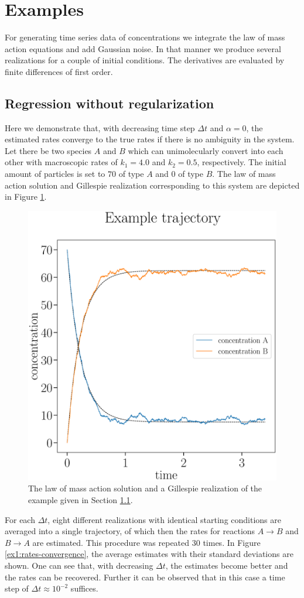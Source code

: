 \documentclass[oneside, abstracton, titlepage]{scrartcl}
\begin{document}
	\section{Examples}

	For generating time series data of concentrations we integrate the law of mass action equations and add Gaussian noise. In that manner we produce several realizations for a couple of initial conditions. The derivatives are evaluated by finite differences of first order.

	\subsection{Regression without regularization}
	\label{sec:ex1}

	Here we demonstrate that, with decreasing time step $\Delta t$ and $\alpha=0$, the estimated rates converge to the true rates if there is no ambiguity in the system. Let there be two species $A$ and $B$ which can unimolecularly convert into each other with macroscopic rates of $k_1=4.0$ and $k_2=0.5$, respectively. The initial amount of particles is set to $70$ of type $A$ and $0$ of type $B$. The law of mass action solution and Gillespie realization corresponding to this system are depicted in Figure \ref{ex1:concentration-curves}.

	\begin{figure}
		\begin{center}
			\includegraphics[width=.5\textwidth]{./figures_tex/aux_ex1_concentration_curves}
		\end{center}
		\caption{The law of mass action solution and a Gillespie realization of the example given in Section \ref{sec:ex1}.}
		\label{ex1:concentration-curves}
	\end{figure}

	For each $\Delta t$, eight different realizations with identical starting conditions are averaged into a single trajectory, of which then the rates for reactions $A\to B$ and $B\to A$ are estimated. This procedure was repeated $30$ times. In Figure \ref{ex1:rates-convergence}, the average estimates with their standard deviations are shown. One can see that, with decreasing $\Delta t$, the estimates become better and the rates can be recovered. Further it can be observed that in this case a time step of $\Delta t\approx 10^{-2}$ suffices.
\end{document}
